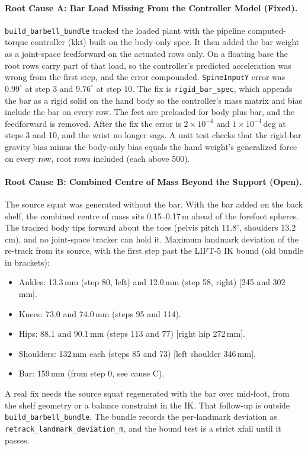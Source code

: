 \documentclass[11pt,a4paper]{article}
\begin{document}
\paragraph{Root Cause A: Bar Load Missing From the Controller Model (Fixed).}
\texttt{build\_barbell\_bundle} tracked the loaded plant with the pipeline
computed-torque controller (kkt) built on the body-only spec. It then added the
bar weight as a joint-space feedforward on the actuated rows only. On a floating
base the root rows carry part of that load, so the controller's predicted
acceleration was wrong from the first step, and the error compounded.
\texttt{SpineInputY} error was $0.99^\circ$ at step 3 and $9.76^\circ$ at
step 10. The fix is \texttt{rigid\_bar\_spec}, which appends the bar as a rigid
solid on the hand body so the controller's mass matrix and bias include the bar
on every row. The feet are preloaded for body plus bar, and the feedforward is
removed. After the fix the error is $2\times10^{-4}$ and $1\times10^{-4}$\,deg
at steps 3 and 10, and the wrist no longer sags. A unit test checks that the
rigid-bar gravity bias minus the body-only bias equals the hand weight's
generalized force on every row, root rows included (each above 500).

\paragraph{Root Cause B: Combined Centre of Mass Beyond the Support (Open).}
The source squat was generated without the bar. With the bar added on the back
shelf, the combined centre of mass sits 0.15--0.17\,m ahead of the forefoot
spheres. The tracked body tips forward about the toes (pelvis pitch
$11.8^\circ$, shoulders 13.2\,cm), and no joint-space tracker can hold it.
Maximum landmark deviation of the re-track from its source, with the first
step past the LIFT-5 IK bound (old bundle in brackets):
\begin{itemize}[nosep]
\item Ankles: 13.3\,mm (step 80, left) and 12.0\,mm (step 58, right)
  [245 and 302\,mm].
\item Knees: 73.0 and 74.0\,mm (steps 95 and 114).
\item Hips: 88.1 and 90.1\,mm (steps 113 and 77) [right hip 272\,mm].
\item Shoulders: 132\,mm each (steps 85 and 73) [left shoulder 346\,mm].
\item Bar: 159\,mm (from step 0, see cause C).
\end{itemize}
A real fix needs the source squat regenerated with the bar over mid-foot, from
the shelf geometry or a balance constraint in the IK. That follow-up is outside
\texttt{build\_barbell\_bundle}. The bundle records the per-landmark deviation
as \texttt{retrack\_landmark\_deviation\_m}, and the bound test is a strict
xfail until it passes.
\end{document}
